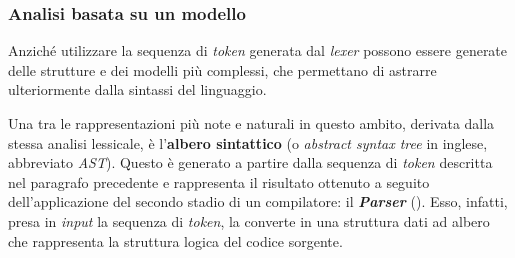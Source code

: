 \subsubsection{Analisi basata su un modello}
Anziché utilizzare la sequenza di \textit{token} generata dal \textit{lexer} possono essere generate delle strutture e dei modelli più complessi, che permettano di astrarre ulteriormente dalla sintassi del linguaggio.

Una tra le rappresentazioni più note e naturali in questo ambito, derivata dalla stessa analisi lessicale, è l'\textbf{albero sintattico} (o \textit{abstract syntax tree} in inglese, abbreviato \textit{AST}).
%
Questo è generato a partire dalla sequenza di \textit{token} descritta nel paragrafo precedente e rappresenta il risultato ottenuto a seguito dell'applicazione del secondo stadio di un compilatore: il \textbf{\textit{Parser}} ().
%
Esso, infatti, presa in \textit{input} la sequenza di \textit{token}, la converte in una struttura dati ad albero che rappresenta la struttura logica del codice sorgente.

